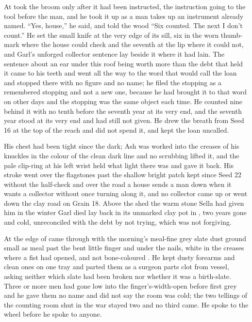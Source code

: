 At   took the broom only after it had been instructed, the instruction going to the tool before the man, and he took it up as a man takes up an instrument already named. “Yes, house,” he said, and told the wood “Six counted. The next I don't count.” He set the small knife at the very edge of its sill, six in the worn thumb-mark where the house could check and the seventh at the lip where it could not, and Garl's unforged collector sentence lay beside it where it had lain. The sentence about an ear under this roof being worth more than the debt that held it came to his teeth and went all the way to the word that would call the loan and stopped there with no figure and no name; he filed the stopping as a remembered stopping and not a new one, because he had brought it to that word on other days and the stopping was the same object each time. He counted nine behind it with no tenth before the seventh year at its very end, and the seventh year stood at its very end and had still not given. He drew the breath from Seed 16 at the top of the reach and did not spend it, and kept the loan uncalled.

His chest had been tight since the dark; Ash was worked into the creases of his knuckles in the colour of the clean dark line and no scrubbing lifted it, and the pale clip-ring at his left wrist held what light there was and gave it back. His stroke went over the flagstones past the shallow bright patch kept since Seed 22 without the half-check and over the road a house sends a man down when it wants a collector without once turning along it, and no collector came up or went down the clay road on Grain 18. Above the shed the warm stone Sella had given him in the winter Garl died lay back in its unmarked clay pot in , two years gone and cold, unreconciled with the debt by not trying, which was not forgiving.

\scenebreak

At the edge of   came through with the morning's meal-fine grey slate dust ground small as meal past the bent little finger and under the nails, white in the creases where a fist had opened, and not bone-coloured . He kept dusty forearms and clean ones on one tray and parted them as a surgeon parts clot from vessel, asking neither which slate had been broken nor whether it was a birth-slate. Three or more men had gone low into the finger's-width-open  before first grey and he gave them no name and did not say the room was cold; the two tellings of the counting room shut in the war stayed two and no third came. He spoke to the wheel before he spoke to anyone.

